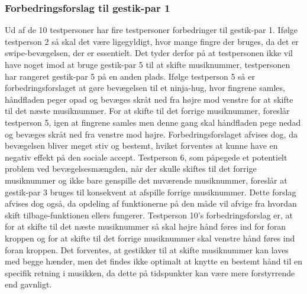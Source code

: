 \subsubsection{Forbedringsforslag til gestik-par 1}
\label{TestresultaterValgAfGestikkerForbedringGP1Skift}
%
Ud af de 10 testpersoner har fire testpersoner forbedringer til gestik-par 1. Ifølge testperson 2 så skal det være ligegyldigt, hvor mange fingre der bruges, da det er swipe-bevægelsen, der er essentielt. Det tyder derfor på at testpersonen ikke vil have noget imod at bruge gestik-par 5 til at skifte musiknummer, testpersonen har rangeret gestik-par 5 på en anden plads. Ifølge testperson 5 så er forbedringsforslaget at gøre bevægelsen til et ninja-hug, hvor fingrene samles, håndfladen peger opad og bevæges skråt ned fra højre mod venstre for at skifte til det næste musiknummer. For at skifte til det forrige musiknummer, foreslår testperson 5, igen at fingrene samles men denne gang skal håndfladen pege nedad og bevæges skråt ned fra venstre mod højre. Forbedringsforslaget afvises dog, da bevægelsen bliver meget stiv og bestemt, hviket forventes at kunne have en negativ effekt på den sociale accept. Testperson 6, som påpegede et potentielt problem ved bevægelsesmængden, når der skulle skiftes til det forrige musiknummer og ikke bare genspille det nuværende musiknummer, foreslår at gestik-par 3 bruges til konsekvent at afspille forrige musiknummer. Dette forslag afvises dog også, da opdeling af funktionerne på den måde vil afvige fra hvordan skift tilbage-funktionen ellers fungerer. Testperson 10's forbedringsforslag er, at for at skifte til det næste musiknummer så skal højre hånd føres ind for foran kroppen og for at skifte til det forrige musiknummer skal venstre hånd føres ind foran kroppen. Det forventes, at gestikker til at skifte musiknummer kan laves med begge hænder, men det findes ikke optimalt at knytte en bestemt hånd til en specifik retning i musikken, da dette på tidspunkter kan være mere forstyrrende end gavnligt.
%
